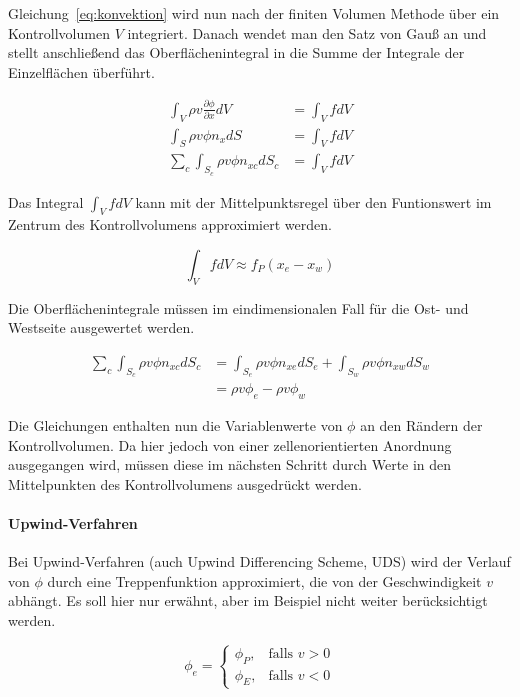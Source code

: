 \documentclass[11pt, ngerman,colorback,accentcolor=tud2d]{tudreport}
\begin{document}
Gleichung~\ref{eq:konvektion} wird nun nach der finiten Volumen Methode über ein
Kontrollvolumen $V$ integriert. Danach wendet man den Satz von Gauß an und stellt
anschließend das Oberflächenintegral in die Summe der Integrale der Einzelflächen
überführt.

\begin{align}
  \int_V \rho v \frac{\partial \phi}{\partial x} dV &= \int_V f dV \nonumber \\
  \int_S \rho v \phi n_x dS &=\int_V f dV \nonumber\\
  \sum_c \int_{S_c} \rho v \phi n_{xc} dS_c &=\int_V f dV \label{eq:base_conv_ready}
\end{align}

Das Integral $\int_V f dV$ kann mit der Mittelpunktsregel über den Funtionswert
im Zentrum des Kontrollvolumens approximiert werden.

\begin{equation}
  \int_V f dV \approx f_P (x_e-x_w) \label{eq:source_term}
\end{equation}

Die Oberflächenintegrale müssen im eindimensionalen Fall für die Ost- und Westseite
ausgewertet werden.

\begin{align}
  \sum_c \int_{S_c} \rho v \phi n_{xc} dS_c &=
  \int_{S_e} \rho v \phi n_{xe} dS_e +\nonumber
  \int_{S_w} \rho v \phi n_{xw} dS_w\\
  &= \rho v \phi_e - \rho v \phi_w \label{eq:surface_east_west}
\end{align}

Die Gleichungen enthalten nun die Variablenwerte von $\phi$ an den Rändern der
Kontrollvolumen. Da hier jedoch von einer zellenorientierten Anordnung ausgegangen
wird, müssen diese im nächsten Schritt durch Werte in den Mittelpunkten des
Kontrollvolumens ausgedrückt werden.

\paragraph{Upwind-Verfahren}
Bei Upwind-Verfahren (auch Upwind Differencing Scheme, UDS) wird der Verlauf von $\phi$ durch eine Treppenfunktion approximiert, die
von der Geschwindigkeit $v$ abhängt. Es soll hier nur erwähnt, aber im Beispiel
nicht weiter berücksichtigt werden.

\begin{equation*}
\phi_e=\left\{\begin{array}{cl} \phi_P, & \mbox{falls }v>0\\
\phi_E, & \mbox{falls } v<0\end{array}\right.
\end{equation*}
\end{document}
